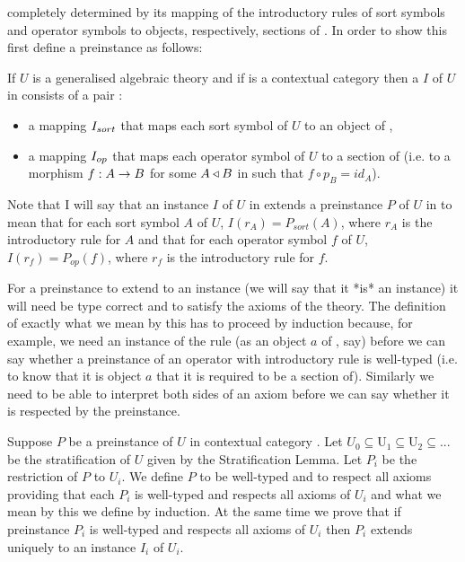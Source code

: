 completely determined by its mapping of the introductory rules of sort symbols and operator symbols to
objects, respectively, sections of \catc. In order to show this first define a preinstance as follows:
\begin{definition}
If $U$ is a generalised algebraic theory  and if \catcw is a contextual category then
a  $I$ of  $U$ in \catcw consists of a pair :
\begin{itemize}
\item a mapping $I_{sort}$ that maps each sort symbol of $U$ to  an object of \catc,
\item a mapping $I_{op}$ that maps each operator symbol of $U$ to a section of \catcw (i.e. to a morphism $f: A \rightarrow B$ for some 
$A \triangleleft B$ in \catcw such that $f \circ p_B=id_A$).
\end{itemize}
\end{definition}

Note that I will say that an instance $I$ of $U$ in \catcw extends a preinstance $P$ of $U$ in \catcw to mean that for each sort symbol $A$ of $U$,
$I(r_A) = P_{sort}(A)$, where $r_A$ is the introductory rule for $A$ and that for each operator symbol
$f$ of $U$,   $I(r_f) = P_{op}(f)$, where $r_f$ is the introductory rule for $f$.

\note
 For a preinstance to extend to an instance (we will say that it *is* an instance) 
it will need be type correct and to satisfy the axioms of the theory. The definition of exactly what we mean by this has to proceed by induction because, for example, we need an instance of the rule
 (as an object $a$ of \catc, say) before we can say whether a preinstance of an operator with introductory rule \genericfintroductoryrule
is well-typed (i.e. to know that it is object $a$ that it is required to be a section of).
Similarly we need to be able to interpret both sides of an axiom before we can say whether it is respected
by the preinstance. 

\note Suppose $P$ be a preinstance of $U$ in contextual category \catc.
Let $U_0 \subseteq $U$_1 \subseteq $U$_2 \subseteq ...$ be the stratification of $U$ given by the Stratification Lemma. 
Let $P_i$ be the restriction of $P$ to $U_i$. 
We define $P$ to be well-typed and to respect all axioms 
providing that  each  $P_i$ is well-typed and respects all axioms of $U_i$ and 
what we mean by this we define by induction. 
At the same time we prove that if preinstance $P_i$ is well-typed and respects all axioms of $U_i$ then $P_i$
extends uniquely to an instance $I_i$ of $U_i$.  

